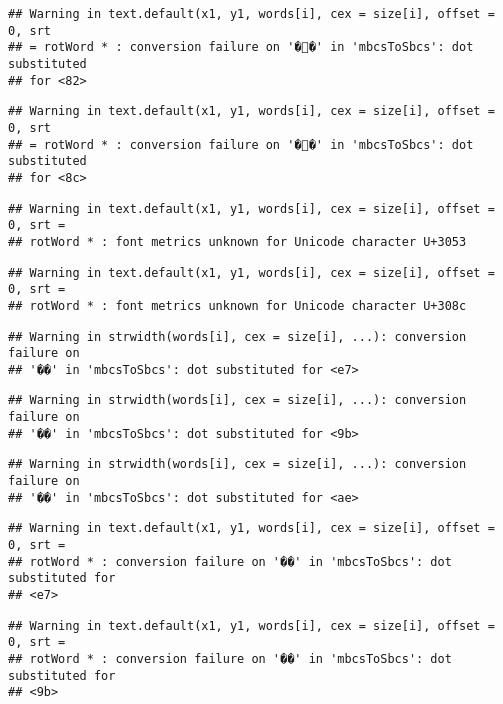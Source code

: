 \documentclass[]{article}
\begin{document}
\begin{verbatim}
## Warning in text.default(x1, y1, words[i], cex = size[i], offset = 0, srt
## = rotWord * : conversion failure on '��' in 'mbcsToSbcs': dot substituted
## for <82>
\end{verbatim}

\begin{verbatim}
## Warning in text.default(x1, y1, words[i], cex = size[i], offset = 0, srt
## = rotWord * : conversion failure on '��' in 'mbcsToSbcs': dot substituted
## for <8c>
\end{verbatim}

\begin{verbatim}
## Warning in text.default(x1, y1, words[i], cex = size[i], offset = 0, srt =
## rotWord * : font metrics unknown for Unicode character U+3053
\end{verbatim}

\begin{verbatim}
## Warning in text.default(x1, y1, words[i], cex = size[i], offset = 0, srt =
## rotWord * : font metrics unknown for Unicode character U+308c
\end{verbatim}

\begin{verbatim}
## Warning in strwidth(words[i], cex = size[i], ...): conversion failure on
## '��' in 'mbcsToSbcs': dot substituted for <e7>
\end{verbatim}

\begin{verbatim}
## Warning in strwidth(words[i], cex = size[i], ...): conversion failure on
## '��' in 'mbcsToSbcs': dot substituted for <9b>
\end{verbatim}

\begin{verbatim}
## Warning in strwidth(words[i], cex = size[i], ...): conversion failure on
## '��' in 'mbcsToSbcs': dot substituted for <ae>
\end{verbatim}

\begin{verbatim}
## Warning in text.default(x1, y1, words[i], cex = size[i], offset = 0, srt =
## rotWord * : conversion failure on '��' in 'mbcsToSbcs': dot substituted for
## <e7>
\end{verbatim}

\begin{verbatim}
## Warning in text.default(x1, y1, words[i], cex = size[i], offset = 0, srt =
## rotWord * : conversion failure on '��' in 'mbcsToSbcs': dot substituted for
## <9b>
\end{verbatim}
\end{document}
